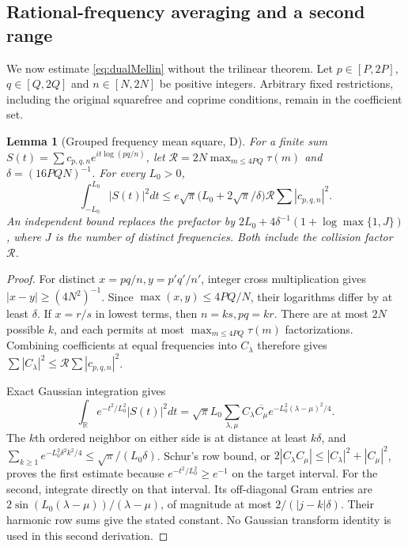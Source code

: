\documentclass[11pt]{article}
\newtheorem{lemma}[theorem]{Lemma}
\theoremstyle{remark}
\newcommand{\R}{\mathbb R}
\begin{document}
\subsection{Rational-frequency averaging and a second range}\label{sec:frequency}
We now estimate \eqref{eq:dualMellin} without the trilinear theorem.
Let $p\in[P,2P]$, $q\in[Q,2Q]$ and $n\in[N,2N]$ be positive integers.
Arbitrary fixed restrictions, including the original squarefree and
coprime conditions, remain in the coefficient set.

\begin{lemma}[Grouped frequency mean square, D]\label{lem:freq}
For a finite sum $S(t)=\sum c_{p,q,n}e^{it\log(pq/n)}$, let
$\mathcal R=2N\max_{m\le4PQ}\tau(m)$ and $\delta=(16PQN)^{-1}$.
For every $L_0>0$,
\[
 \int_{-L_0}^{L_0}|S(t)|^2dt
 \le e\sqrt\pi\bigl(L_0+2\sqrt\pi/\delta\bigr)
       \mathcal R\sum|c_{p,q,n}|^2.
\]
An independent bound replaces the prefactor by
$2L_0+4\delta^{-1}(1+\log\max\{1,J\})$, where $J$ is the number of
distinct frequencies. Both include the collision factor $\mathcal R$.
\end{lemma}
\begin{proof}
For distinct $x=pq/n,y=p'q'/n'$, integer cross multiplication gives
$|x-y|\ge(4N^2)^{-1}$. Since $\max(x,y)\le4PQ/N$, their logarithms
differ by at least $\delta$. If $x=r/s$ in lowest terms, then
$n=ks,pq=kr$. There are at most $2N$ possible $k$, and each permits
at most $\max_{m\le4PQ}\tau(m)$ factorizations. Combining coefficients
at equal frequencies into $C_\lambda$ therefore gives
$\sum|C_\lambda|^2\le\mathcal R\sum|c_{p,q,n}|^2$.

Exact Gaussian integration gives
\[
 \int_{\R}e^{-t^2/L_0^2}|S(t)|^2dt
 =\sqrt\pi L_0\sum_{\lambda,\mu}
 C_\lambda\overline{C_\mu}e^{-L_0^2(\lambda-\mu)^2/4}.
\]
The $k$th ordered neighbor on either side is at distance at least
$k\delta$, and
$\sum_{k\ge1}e^{-L_0^2\delta^2k^2/4}\le\sqrt\pi/(L_0\delta)$.
Schur's row bound, or $2|C_\lambda C_\mu|\le|C_\lambda|^2+|C_\mu|^2$,
proves the first estimate because $e^{-t^2/L_0^2}\ge e^{-1}$ on
the target interval. For the second, integrate directly on that
interval. Its off-diagonal Gram entries are
$2\sin(L_0(\lambda-\mu))/(\lambda-\mu)$, of magnitude at most
$2/(|j-k|\delta)$. Their harmonic row sums give the stated constant.
No Gaussian transform identity is used in this second derivation.
\end{proof}
\end{document}
